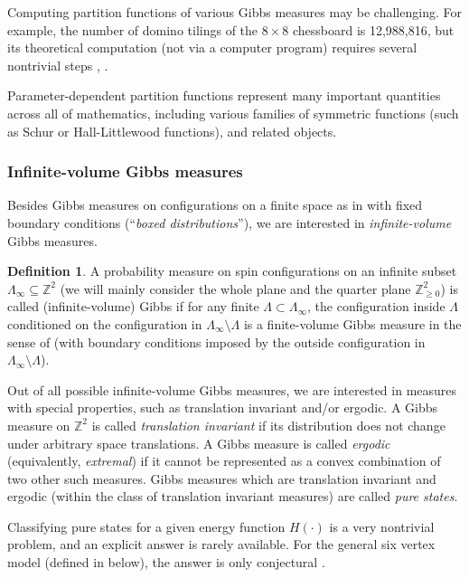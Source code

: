 \documentclass[letterpaper,11pt,oneside,reqno]{article}
\numberwithin{equation}{section}
\theoremstyle{definition}
\newtheorem{definition}[proposition]{Definition}
\theoremstyle{remark}
\begin{document}
Computing partition functions of various Gibbs measures
may be challenging. For example, the number of 
domino tilings of the $8\times 8$ chessboard is 12,988,816,
but its theoretical computation (not via a computer program)
requires several nontrivial steps \cite{Kasteleyn1961}, \cite{temperley1961dimer}. 

Parameter-dependent partition functions represent many important 
quantities across all of mathematics, including various
families of symmetric functions (such as Schur or Hall-Littlewood functions), and related objects.

\subsubsection{Infinite-volume Gibbs measures}

Besides Gibbs measures on configurations on a
finite space as in  with fixed boundary
conditions (``\emph{boxed distributions}''), we are 
interested
in \emph{infinite-volume} Gibbs measures. 

\begin{definition}
	\label{def:infinite_Gibbs}
	A probability measure on spin configurations on 
	an infinite subset $\Lambda_\infty\subseteq\mathbb{Z}^{2}$
	(we will mainly consider the whole plane and the quarter plane $\mathbb{Z}_{\ge0}^{2}$)
	is called (infinite-volume) Gibbs if for any finite $\Lambda\subset \Lambda_\infty$,
	the configuration inside $\Lambda$
	conditioned on the configuration in $\Lambda_\infty\setminus \Lambda$
	is a finite-volume Gibbs measure in the sense of 
	(with boundary conditions imposed by the outside configuration in $\Lambda_\infty\setminus \Lambda$).
\end{definition}

Out of all possible infinite-volume Gibbs measures, we are interested in measures with 
special properties, such as translation invariant and/or ergodic.
A Gibbs measure on $\mathbb{Z}^{2}$ is called \emph{translation invariant}
if its distribution does not change under arbitrary
space translations. 
A Gibbs measure is called \emph{ergodic} (equivalently, \emph{extremal})
if it cannot be represented as a convex combination of 
two other such measures.
Gibbs measures which are translation invariant
and ergodic (within the class of translation invariant measures)
are called \emph{pure states}.

Classifying pure states for a given energy function $H(\cdot)$ is a very
nontrivial problem, and an 
explicit answer is rarely available. 
For the general six vertex model 
(defined in  below),
the answer is only conjectural
\cite{reshetikhin2010lectures}.
\end{document}

